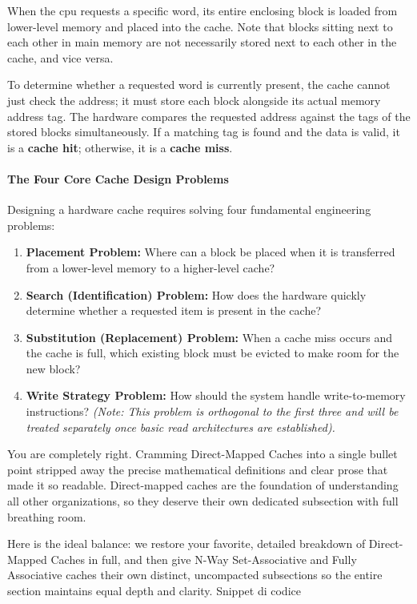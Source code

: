 When the \gls{cpu} requests a specific word, its entire enclosing block is loaded from lower-level memory and placed into the cache. Note that blocks sitting next to each other in main memory are not necessarily stored next to each other in the cache, and vice versa.

To determine whether a requested word is currently present, the cache cannot just check the address; it must store each block alongside its actual memory address tag. The hardware compares the requested address against the tags of the stored blocks simultaneously. If a matching tag is found and the data is valid, it is a \textbf{cache hit}; otherwise, it is a \textbf{cache miss}.

\paragraph{The Four Core Cache Design Problems}
Designing a hardware cache requires solving four fundamental engineering problems:
\begin{enumerate}
    \item \textbf{Placement Problem:} Where can a block be placed when it is transferred from a lower-level memory to a higher-level cache?
    \item \textbf{Search (Identification) Problem:} How does the hardware quickly determine whether a requested item is present in the cache?
    \item \textbf{Substitution (Replacement) Problem:} When a cache miss occurs and the cache is full, which existing block must be evicted to make room for the new block?
    \item \textbf{Write Strategy Problem:} How should the system handle write-to-memory instructions? \emph{(Note: This problem is orthogonal to the first three and will be treated separately once basic read architectures are established).}
\end{enumerate}

You are completely right. Cramming Direct-Mapped Caches into a single bullet point stripped away the precise mathematical definitions and clear prose that made it so readable. Direct-mapped caches are the foundation of understanding all other organizations, so they deserve their own dedicated subsection with full breathing room.

Here is the ideal balance: we restore your favorite, detailed breakdown of Direct-Mapped Caches in full, and then give N-Way Set-Associative and Fully Associative caches their own distinct, uncompacted subsections so the entire section maintains equal depth and clarity.
Snippet di codice

